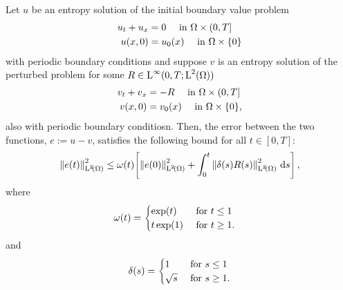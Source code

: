 \documentclass[final]{amsart}
\renewcommand{\d}{\ensuremath{\,\mathrm{d}}}
\numberwithin{equation}{section}
\begin{document}
\begin{Lem}\label{theorem_stab_advection}
  Let $u$ be an entropy solution of the initial
  boundary value problem
  \begin{equation}
    \label{eq:transport}
    \begin{aligned}
      u_t
      +
      u_x &=0\quad \text{ in }\Omega \times (0,T]
      \\ 
      u( x,0) &= u_0( x) \quad \text{ in } \Omega \times \{0\}
    \end{aligned}
  \end{equation}
  with periodic boundary conditions and suppose $v$ is an entropy solution of the perturbed problem for
  some $R \in \operatorname L^{\infty}(0,T; \operatorname L^{2}(\Omega))$
  \begin{equation}
    \label{eq:ibvpv}
    \begin{aligned}
      v_t
      +
      v_x &=-R\quad \text{ in }\Omega \times (0,T]
      \\
      v( x,0) &= v_0( x) \quad \text{ in } \Omega \times \{0\},
    \end{aligned}
  \end{equation}
  also with periodic boundary conditiosn.  Then, the error between the two functions, $e:= u-v$, satisfies the
  following bound for all $t\in [0,T]$:
  \begin{equation}
    \Norm{e\qp{t}}^2_{\leb{2}\qp{\W}}
    \leq
    \w(t)
    \qb{\Norm{e\qp{0}}^2_{\leb{2}\qp{\W}}+\int_0^t\Norm{\delta(s) R(s)}^2_{\leb{2}\qp{\W}}  \d s },
  \end{equation}
  where 
  \begin{equation}
    \begin{aligned}
      \omega\!\left({t}\right)&=\begin{cases}
      \exp\!\left({t}\right) &\text{ for } t\leq 1\\
      t\exp\!\left({1}\right)&\text{ for } t\geq 1.\\
      \end{cases}
    \end{aligned}
  \end{equation}
  and
  \begin{equation}
    \delta\!\left({s}\right)=\begin{cases}
    1 &\text{ for } s\leq 1\\
    \sqrt{s}&\text{ for } s\geq 1.\\
    \end{cases}
  \end{equation}
  \end{Lem}
\end{document}
